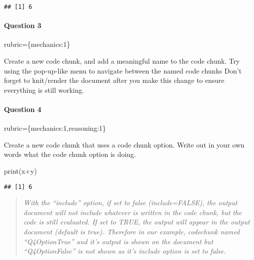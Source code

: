 \documentclass[
]{article}
\newenvironment{Shaded}{\begin{snugshade}}{\end{snugshade}}
\newcommand{\FunctionTok}[1]{\textcolor[rgb]{0.00,0.00,0.00}{#1}}
\newcommand{\NormalTok}[1]{#1}
\newcommand{\SpecialCharTok}[1]{\textcolor[rgb]{0.00,0.00,0.00}{#1}}
\begin{document}
\begin{verbatim}
## [1] 6
\end{verbatim}

\begin{alert alert-info}
\hypertarget{question-3}{%
\paragraph{Question 3}\label{question-3}}

rubric=\{mechanics:1\}

Create a new code chunk, and add a meaningful name to the code chunk.
Try using the pop-up-like menu to navigate between the named code chunks
Don't forget to knit/render the document after you make this change to
ensure everything is still working.
\end{alert alert-info}

\begin{alert alert-info}
\hypertarget{question-4}{%
\paragraph{Question 4}\label{question-4}}

rubric=\{mechanics:1,reasoning:1\}

Create a new code chunk that uses a code chunk option. Write out in your
own words what the code chunk option is doing.
\end{alert alert-info}

\begin{Shaded}
\begin{Highlighting}[]
\FunctionTok{print}\NormalTok{(x}\SpecialCharTok{+}\NormalTok{y)}
\end{Highlighting}
\end{Shaded}

\begin{verbatim}
## [1] 6
\end{verbatim}

\begin{quote}
\emph{With the ``include'' option, if set to false (include=FALSE), the
output document will not include whatever is written in the code chunk,
but the code is still evaluated. If set to TRUE, the output will appear
in the output document (default is true). Therefore in our example,
codechunk named ``Q4OptionTrue'' and it's output is shown on the
document but ``Q4OptionFalse'' is not shown as it's include option is
set to false.}
\end{quote}
\end{document}
